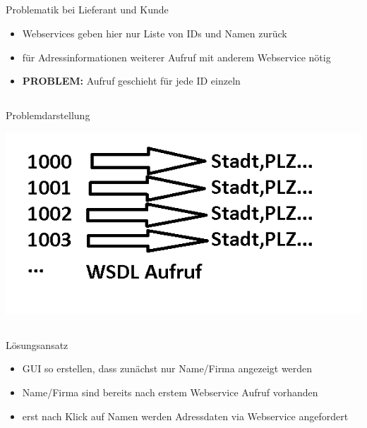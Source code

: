 \documentclass[xcolor={usenames,dvipsnames}, compress, 10pt]{beamer}
\begin{document}
\subsection*{}

\begin{frame}{Problematik bei Lieferant und Kunde}
\begin{center}

\begin{itemize}
\item Webservices geben hier nur Liste von IDs und Namen zurück
\item für Adressinformationen weiterer Aufruf mit anderem Webservice nötig
\item \textbf{PROBLEM: } Aufruf geschieht für jede ID einzeln
\end{itemize}

\end{center}
\end{frame}

\subsection*{}

\begin{frame}{Problemdarstellung}
\begin{center}

\includegraphics[width=\textheight]{Bilder/presi1.png} 

\end{center}
\end{frame}

\subsection*{}

\begin{frame}{Lösungsansatz}
\begin{center}

\begin{itemize}
\item GUI so erstellen, dass zunächst nur Name/Firma angezeigt werden
\item Name/Firma sind bereits nach erstem Webservice Aufruf vorhanden
\item erst nach Klick auf Namen werden Adressdaten via Webservice angefordert
\end{itemize}

\end{center}
\end{frame}
\end{document}
